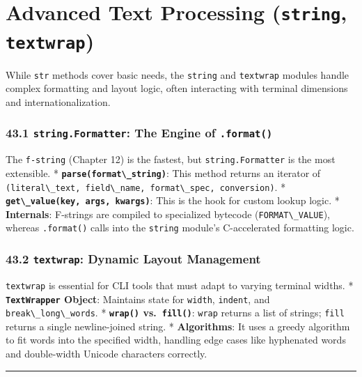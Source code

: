 \hypertarget{advanced-text-processing-string-textwrap}{%
\chapter{\texorpdfstring{Advanced Text Processing (\texttt{string},
\texttt{textwrap})}{Advanced Text Processing (string, textwrap)}}\label{advanced-text-processing-string-textwrap}}

While \passthrough{\lstinline!str!} methods cover basic needs, the
\passthrough{\lstinline!string!} and \passthrough{\lstinline!textwrap!}
modules handle complex formatting and layout logic, often interacting
with terminal dimensions and internationalization.

\hypertarget{string.formatter-the-engine-of-.format}{%
\subsection{\texorpdfstring{43.1 \texttt{string.Formatter}: The Engine
of
\texttt{.format()}}{43.1 string.Formatter: The Engine of .format()}}\label{string.formatter-the-engine-of-.format}}

The \passthrough{\lstinline!f-string!} (Chapter 12) is the fastest, but
\passthrough{\lstinline!string.Formatter!} is the most extensible. *
\textbf{\passthrough{\lstinline!parse(format\_string)!}}: This method
returns an iterator of
\passthrough{\lstinline!(literal\_text, field\_name, format\_spec, conversion)!}.
* \textbf{\passthrough{\lstinline!get\_value(key, args, kwargs)!}}: This
is the hook for custom lookup logic. * \textbf{Internals}: F-strings are
compiled to specialized bytecode
(\passthrough{\lstinline!FORMAT\_VALUE!}), whereas
\passthrough{\lstinline!.format()!} calls into the
\passthrough{\lstinline!string!} module's C-accelerated formatting
logic.

\hypertarget{textwrap-dynamic-layout-management}{%
\subsection{\texorpdfstring{43.2 \texttt{textwrap}: Dynamic Layout
Management}{43.2 textwrap: Dynamic Layout Management}}\label{textwrap-dynamic-layout-management}}

\passthrough{\lstinline!textwrap!} is essential for CLI tools that must
adapt to varying terminal widths. *
\textbf{\passthrough{\lstinline!TextWrapper!} Object}: Maintains state
for \passthrough{\lstinline!width!}, \passthrough{\lstinline!indent!},
and \passthrough{\lstinline!break\_long\_words!}. *
\textbf{\passthrough{\lstinline!wrap()!}
vs.~\passthrough{\lstinline!fill()!}}: \passthrough{\lstinline!wrap!}
returns a list of strings; \passthrough{\lstinline!fill!} returns a
single newline-joined string. * \textbf{Algorithms}: It uses a greedy
algorithm to fit words into the specified width, handling edge cases
like hyphenated words and double-width Unicode characters correctly.

\begin{center}\rule{0.5\linewidth}{0.5pt}\end{center}
